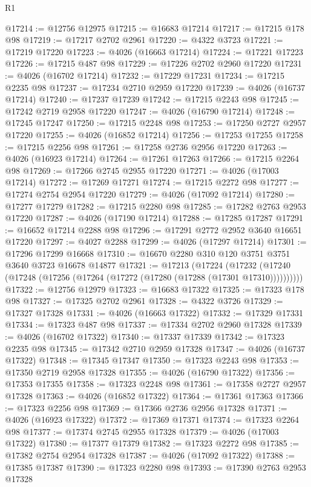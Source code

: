 \begin{lexlean}{R1}
\begin{coremodule}
@17214 := @12756 @12975
@17215 := @16683 @17214
@17217 := @17215 @178 @98
@17219 := @17217 @2702 @2961
@17220 := @4322 @3723
@17221 := @17219 @17220
@17223 := @4026 (@16663 @17214)
@17224 := @17221 @17223
@17226 := @17215 @487 @98
@17229 := @17226 @2702 @2960 @17220
@17231 := @4026 (@16702 @17214)
@17232 := @17229 @17231
@17234 := @17215 @2235 @98
@17237 := @17234 @2710 @2959 @17220
@17239 := @4026 (@16737 @17214)
@17240 := @17237 @17239
@17242 := @17215 @2243 @98
@17245 := @17242 @2719 @2958 @17220
@17247 := @4026 (@16790 @17214)
@17248 := @17245 @17247
@17250 := @17215 @2248 @98
@17253 := @17250 @2727 @2957 @17220
@17255 := @4026 (@16852 @17214)
@17256 := @17253 @17255
@17258 := @17215 @2256 @98
@17261 := @17258 @2736 @2956 @17220
@17263 := @4026 (@16923 @17214)
@17264 := @17261 @17263
@17266 := @17215 @2264 @98
@17269 := @17266 @2745 @2955 @17220
@17271 := @4026 (@17003 @17214)
@17272 := @17269 @17271
@17274 := @17215 @2272 @98
@17277 := @17274 @2754 @2954 @17220
@17279 := @4026 (@17092 @17214)
@17280 := @17277 @17279
@17282 := @17215 @2280 @98
@17285 := @17282 @2763 @2953 @17220
@17287 := @4026 (@17190 @17214)
@17288 := @17285 @17287
@17291 := @16652 @17214 @2288 @98
@17296 := @17291 @2772 @2952 @3640 @16651 @17220
@17297 := @4027 @2288
@17299 := @4026 (@17297 @17214)
@17301 := @17296 @17299 @16668
@17310 := @16670 @2280 @310 @120 @3751 @3751 @3640 @3723 @16678 @14877
@17321 := @17213
    (@17224 (@17232 (@17240 (@17248 (@17256 (@17264 (@17272 (@17280 (@17288 (@17301 @17310))))))))))
@17322 := @12756 @12979
@17323 := @16683 @17322
@17325 := @17323 @178 @98
@17327 := @17325 @2702 @2961
@17328 := @4322 @3726
@17329 := @17327 @17328
@17331 := @4026 (@16663 @17322)
@17332 := @17329 @17331
@17334 := @17323 @487 @98
@17337 := @17334 @2702 @2960 @17328
@17339 := @4026 (@16702 @17322)
@17340 := @17337 @17339
@17342 := @17323 @2235 @98
@17345 := @17342 @2710 @2959 @17328
@17347 := @4026 (@16737 @17322)
@17348 := @17345 @17347
@17350 := @17323 @2243 @98
@17353 := @17350 @2719 @2958 @17328
@17355 := @4026 (@16790 @17322)
@17356 := @17353 @17355
@17358 := @17323 @2248 @98
@17361 := @17358 @2727 @2957 @17328
@17363 := @4026 (@16852 @17322)
@17364 := @17361 @17363
@17366 := @17323 @2256 @98
@17369 := @17366 @2736 @2956 @17328
@17371 := @4026 (@16923 @17322)
@17372 := @17369 @17371
@17374 := @17323 @2264 @98
@17377 := @17374 @2745 @2955 @17328
@17379 := @4026 (@17003 @17322)
@17380 := @17377 @17379
@17382 := @17323 @2272 @98
@17385 := @17382 @2754 @2954 @17328
@17387 := @4026 (@17092 @17322)
@17388 := @17385 @17387
@17390 := @17323 @2280 @98
@17393 := @17390 @2763 @2953 @17328

\end{coremodule}
\end{lexlean}
